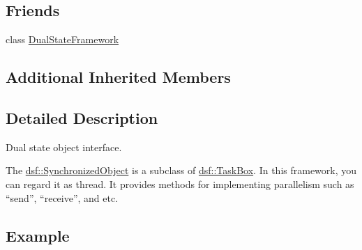 \subsection*{Friends}
\begin{DoxyCompactItemize}
\item 
class \hyperlink{classdsf_1_1_synchronized_object_a86db03c65431cb461cc8abf33bd2e74a}{Dual\+State\+Framework}
\end{DoxyCompactItemize}
\subsection*{Additional Inherited Members}


\subsection{Detailed Description}
Dual state object interface. 

The \hyperlink{classdsf_1_1_synchronized_object}{dsf\+::\+Synchronized\+Object} is a subclass of \hyperlink{classdsf_1_1_task_box}{dsf\+::\+Task\+Box}. In this framework, you can regard it as thread. It provides methods for implementing parallelism such as “send”, “receive”, and etc.\hypertarget{classdsf_1_1_synchronized_var_Example}{}\subsection{Example}\label{classdsf_1_1_synchronized_var_Example}

